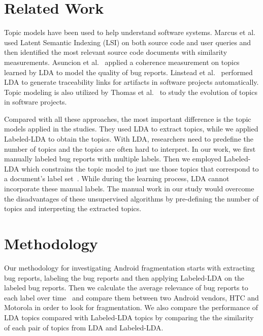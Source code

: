 \documentclass[10pt, conference, compsocconf]{IEEEtran}
\begin{document}



\section{Related Work}
\label{sec:relatedwork}
Topic models have been used to help understand software systems. Marcus et al.~\cite{Marcus04aninformation} used Latent Semantic Indexing (LSI) on both source code and user queries and then identified the most relevant source code documents with similarity measurements. Asuncion et al.~\cite{Asuncion:2010} applied a coherence measurement on topics learned by LDA to model the quality of bug reports. Linstead et al.~\cite{Linstead:2009} performed LDA to generate traceability links for artifacts in software projects automatically. Topic modeling is also utilized by Thomas et al.~\cite{Thomas:2011} to study the evolution of topics in software projects.

Compared with all these approaches, the most important difference is the topic models applied in the studies. They used LDA to extract topics, while we applied Labeled-LDA to obtain the topics. With LDA, researchers need to predefine the number of topics and the topics are often hard to interpret. In our work, we first manually labeled bug reports with multiple labels. Then we employed Labeled-LDA which constrains the topic model to just use those topics that correspond to a document's label set~\cite{labeledlda}. While during the learning process, LDA cannot incorporate these manual labels. The manual work in our study would overcome the disadvantages of these unsupervised algorithms by pre-defining the number of topics and interpreting the extracted topics. 

\section{Methodology}
\label{sec:methodology}

Our methodology for investigating Android fragmentation starts with extracting
bug reports, labeling the bug reports and then applying
Labeled-LDA on the labeled bug reports.
Then 
 we calculate the average relevance of bug reports to each label
over time~\cite{Hindle} and compare them between two Android vendors,
HTC and Motorola in order to look for fragmentation.
We also compare the performance of LDA topics compared with
Labeled-LDA topics by comparing the 
the similarity of each pair of
topics from LDA and Labeled-LDA.
\end{document}
